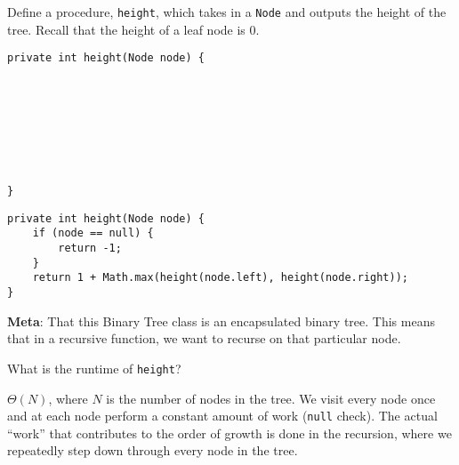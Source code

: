 
\begin{blocksection}
\question Define a procedure, \lstinline$height$, which takes in a
\lstinline$Node$ and outputs the height of the tree. Recall that the height of a leaf node is 0.

\ifprintanswers
\else
\begin{lstlisting}
private int height(Node node) {








}
\end{lstlisting}
\fi

\begin{solution}
\begin{lstlisting}
private int height(Node node) {
    if (node == null) {
        return -1;
    }
    return 1 + Math.max(height(node.left), height(node.right));
}
\end{lstlisting}

\textbf{Meta}: That this Binary Tree class is an encapsulated binary tree. This
means that in a recursive function, we want to recurse on that particular node.
\end{solution}

What is the runtime of \lstinline$height$?
\begin{solution}[0.25in]
$\Theta(N)$, where $N$ is the number of nodes in the tree. We visit every node
once and at each node perform a constant amount of work (\lstinline$null$
check). The actual ``work'' that contributes to the order of growth is done in
the recursion, where we repeatedly step down through every node in the tree.
\end{solution}
\end{blocksection}
